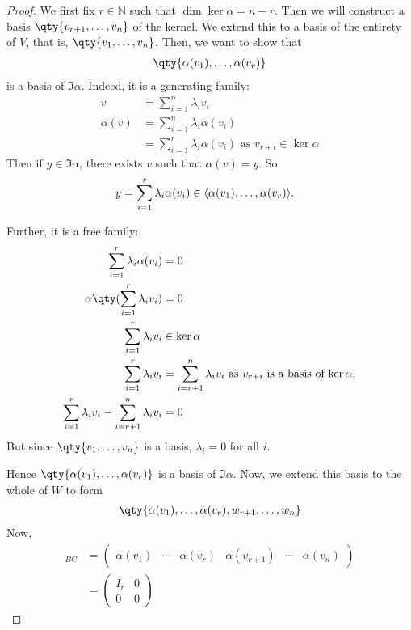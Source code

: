 \begin{proof}
    We first fix $r \in \mathbb N$ such that $\dim \ker \alpha = n - r$.
    Then we will construct a basis $\qty{v_{r+1}, \dots, v_n}$ of the kernel.
    We extend this to a basis of the entirety of $V$, that is, $\qty{v_1,\dots,v_n}$.
    Then, we want to show that
    \begin{align*}
        \qty{\alpha(v_1), \dots, \alpha(v_r)}
    \end{align*}
    is a basis of $\Im \alpha$.
    Indeed, it is a generating family:
    \begin{align*}
        v &= \sum_{i=1}^n \lambda_i v_i         \\
        \alpha(v) &= \sum_{i=1}^n \lambda_i \alpha(v_i) \\
        &= \sum_{i=1}^r \lambda_i \alpha(v_i) \text{ as $v_{r + i} \in \ker \alpha$}
    \end{align*}
    Then if $y \in \Im \alpha$, there exists $v$ such that $\alpha(v) = y$.
    So \begin{align*}
        y &= \sum_{i=1}^{r}  \lambda_i \alpha(v_i) \in \langle{} \alpha(v_1), \dots, \alpha(v_r) \rangle.
    \end{align*} 

    Further, it is a free family:
    \begin{align*}
        \sum_{i=1}^r \lambda_i \alpha(v_i) &= 0 \\
        \alpha\qty(\sum_{i=1}^r \lambda_i v_i) &= 0 \\
        \sum_{i=1}^r \lambda_i v_i & \in \ker \alpha \\
        \sum_{i=1}^r \lambda_i v_i &= \sum_{i=r+1}^n \lambda_i v_i \text{ as $v_{r + i}$ is a basis of $\ker \alpha$.}\\
        \sum_{i=1}^r \lambda_i v_i - \sum_{i=r+1}^n \lambda_i v_i &= 0
    \end{align*}
    But since $\qty{v_1, \dots, v_n}$ is a basis, $\lambda_i = 0$ for all $i$.

    Hence $\qty{\alpha(v_1), \dots, \alpha(v_r)}$ is a basis of $\Im \alpha$.
    Now, we extend this basis to the whole of $W$ to form
    \begin{align*}
        \qty{\alpha(v_1), \dots, \alpha(v_r), w_{r+1}, \dots, w_n}
    \end{align*}
    Now,
    \begin{align*}
        [\alpha]_{BC} & = \begin{pmatrix}
            \alpha(v_1) & \cdots & \alpha(v_r) & \alpha(v_{r+1}) & \cdots & \alpha(v_n)
        \end{pmatrix} \\
                    & = \begin{pmatrix}
            I_r & 0 \\
            0   & 0
        \end{pmatrix}
    \end{align*}
\end{proof}
